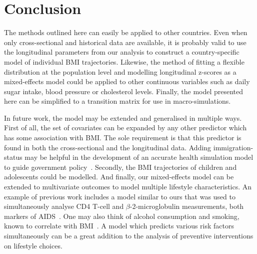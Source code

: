 \documentclass{imammb}
\numberwithin{equation}{section}
\begin{document}
\section{Conclusion}
\label{sec:Conclusion}

The methods outlined here can easily be applied to other countries. Even when only cross-sectional and historical data are available, it is probably valid to use the longitudinal parameters from our analysis to construct a country-specific model of individual BMI trajectories. Likewise, the method of fitting a flexible distribution at the population level and modelling longitudinal z-scores as a mixed-effects model could be applied to other continuous variables such as daily sugar intake, blood pressure or cholesterol levels. Finally, the model presented here can be simplified to a transition matrix for use in macro-simulations.

In future work, the model may be extended and generalised in multiple ways. First of all, the set of covariates can be expanded by any other predictor which has some association with BMI. The sole requirement is that this predictor is found in both the cross-sectional and the longitudinal data. Adding immigration-status may be helpful in the development of an accurate health simulation model to guide government policy~\citep{TenDam2023}. Secondly, the BMI trajectories of children and adolescents could be modelled. And finally, our mixed-effects model can be extended to multivariate outcomes to model multiple lifestyle characteristics. An example of previous work includes a model similar to ours that was used to simultaneously analyse CD4 T-cell and $\beta$-2-microglobulin measurements, both markers of AIDS~\citep{Sy1997}. One may also think of alcohol consumption and smoking, known to correlate with BMI~\citep{Chiolero2008, Traversy2015}. A model which predicts various risk factors simultaneously can be a great addition to the analysis of preventive interventions on lifestyle choices.

\vspace*{6pt}

\nocite{*}


\end{document}
